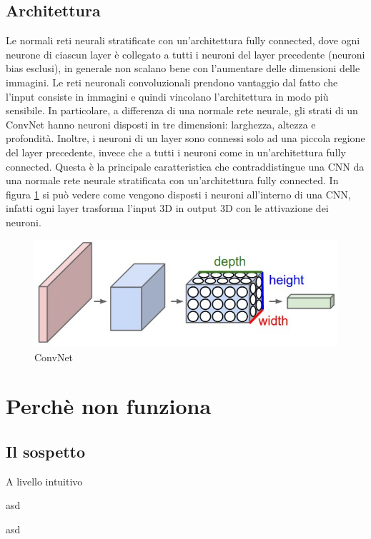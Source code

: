 \documentclass[twoside,twocolumn,10pt]{extarticle}
\theoremstyle{definition}
\begin{document}
\subsection{Architettura}
Le normali reti neurali stratificate con un'architettura fully connected, dove ogni neurone di ciascun layer è collegato a tutti i neuroni del layer precedente (neuroni bias esclusi), in generale non scalano bene con l'aumentare delle dimensioni delle immagini.
Le reti neuronali convoluzionali prendono vantaggio dal fatto che l'input consiste in immagini e quindi vincolano l'architettura in modo più sensibile. In particolare, a differenza di una normale rete neurale, gli strati di un ConvNet hanno neuroni disposti in tre dimensioni: larghezza, altezza e profondità. 
Inoltre, i neuroni di un layer sono connessi solo ad una piccola regione del layer precedente, invece che a tutti i neuroni come in un'architettura fully connected. Questa è la principale caratteristica che contraddistingue una CNN da una normale rete neurale stratificata con un'architettura fully connected. In figura \ref{fig:cnn} si può vedere come vengono disposti i neuroni all'interno di una CNN, infatti  ogni layer trasforma l'input 3D in output 3D con le attivazione dei neuroni. 
	\begin{figure}[h]
	\centering
	\includegraphics[scale=.4]{images/cnn.jpeg}
	\caption{ConvNet}
	\label{fig:cnn}
\end{figure}
\section{Perchè non funziona}\label{}
	\subsection{Il sospetto}
		A livello intuitivo
		\begin{table}[h]
			\centering
			\caption{asd}
			
			\label{tab:gerarchia}
		\end{table}
		\begin{table}[h]
			\centering
			\caption{asd}
			\label{tab:pgm}
			
		\end{table}
	
\end{document}
